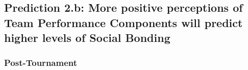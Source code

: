 \begin{CJK}{UTF8}{gbsn}
      \subsection{Prediction 2.b: More positive perceptions of Team Performance Components will predict higher levels of Social Bonding\label{app8:prediction2b}}



\subsubsection{Post-Tournament\label{app8:prediction2bPost}}




      \begin{figure}[htbp]


\end{figure}
\end{CJK}
